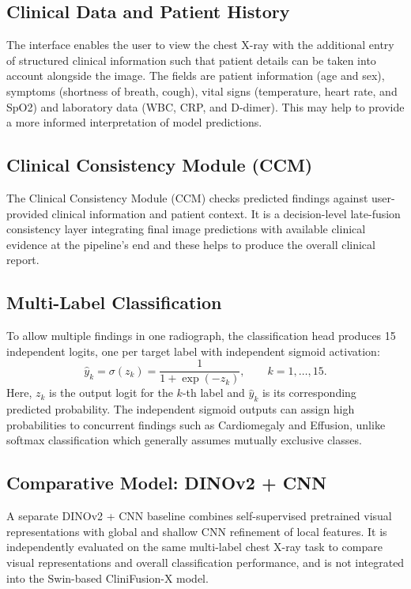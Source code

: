 \documentclass[conference]{IEEEtran}
\begin{document}
\subsection{\textbf{Clinical Data and Patient History}}
The interface enables the user to view the chest X-ray with the additional entry of structured clinical information such that patient details can be taken into account alongside the image. The fields are patient information (age and sex), symptoms (shortness of breath, cough), vital signs (temperature, heart rate, and SpO2) and laboratory data (WBC, CRP, and D-dimer). This may help to provide a more informed interpretation of model predictions.
\subsection{\textbf{Clinical Consistency Module (CCM)}}
The Clinical Consistency Module (CCM) checks predicted findings against user-provided clinical information and patient context. It is a decision-level late-fusion consistency layer integrating final image predictions with available clinical evidence at the pipeline's end and these helps to produce the overall clinical report.
\subsection{\textbf{Multi-Label Classification}}
To allow multiple findings in one radiograph, the classification head produces 15 independent logits, one per target label with independent sigmoid activation:
\begin{equation}
\hat{y}_k
=
\sigma(z_k)
=
\frac{1}{1+\exp(-z_k)},
\qquad k=1,\ldots,15.
\end{equation}
Here, $z_k$ is the output logit for the $k$-th label and $\hat{y}_k$ is its corresponding predicted probability. The independent sigmoid outputs can assign high probabilities to concurrent findings such as Cardiomegaly and Effusion, unlike softmax classification which generally assumes mutually exclusive classes.
\subsection{\textbf{Comparative Model: DINOv2 + CNN}}
A separate DINOv2 + CNN baseline combines self-supervised pretrained visual representations with global and shallow CNN refinement of local features. It is independently evaluated
on the same multi-label chest X-ray task to compare visual
representations and overall classification performance, and is
not integrated into the Swin-based CliniFusion-X model.
\end{document}

